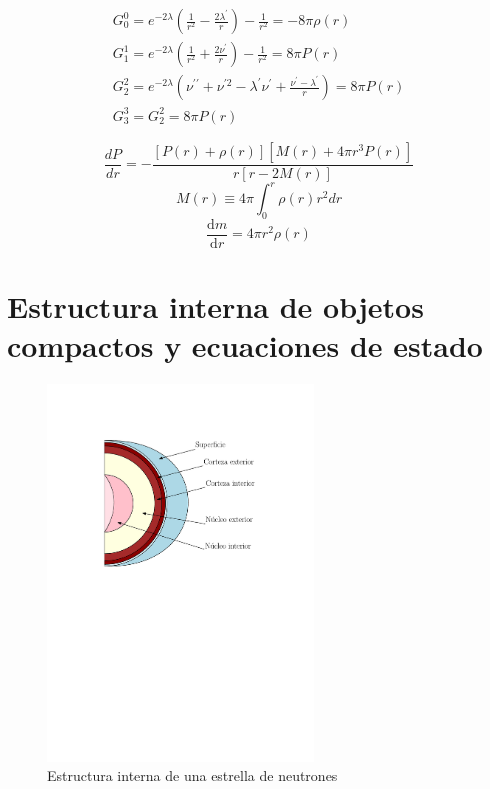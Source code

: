 \begin{equation}
    \begin{array} { l } { G _ { 0 } ^ { 0 } = e ^ { - 2 \lambda } \left( \frac { 1 } { r ^ { 2 } } - \frac { 2 \lambda ^ { \prime } } { r } \right) - \frac { 1 } { r ^ { 2 } } = - 8 \pi  \rho ( r ) } \\ { G _ { 1 } ^ { 1 } = e ^ { - 2 \lambda } \left( \frac { 1 } { r ^ { 2 } } + \frac { 2 \nu ^ { \prime } } { r } \right) - \frac { 1 } { r ^ { 2 } } = 8 \pi  P ( r ) } \\ { G _ { 2 } ^ { 2 } = e ^ { - 2 \lambda } \left( \nu ^ { \prime \prime } + \nu ^ { \prime 2 } - \lambda ^ { \prime } \nu ^ { \prime } + \frac { \nu ^ { \prime } - \lambda ^ { \prime } } { r } \right) = 8 \pi  P ( r ) } \\ { G _ { 3 } ^ { 3 } = G _ { 2 } ^ { 2 } = 8 \pi  P ( r ) } \end{array}
\end{equation}

\begin{equation}
    \frac { d P } { d r } = - \frac { [ P ( r ) + \rho ( r ) ] \left[ M ( r ) + 4 \pi r ^ { 3 } P ( r ) \right] } { r [ r - 2 M ( r ) ] }
\end{equation}
\begin{equation}
    M ( r ) \equiv 4 \pi \int _ { 0 } ^ { r } \rho ( r ) r ^ { 2 } d r
\end{equation}
\begin{equation}
    \frac { \mathrm { d } m } { \mathrm { d } r } = 4 \pi r ^ { 2 } \rho(r)
\end{equation}



\section{Estructura interna de objetos compactos y ecuaciones de estado}

\begin{figure}[H]
    \centering
    \includegraphics[width=200pt]{figures/neutronstar.pdf}
    \caption{Estructura interna de una estrella de neutrones}
    \label{NSS}
\end{figure}

